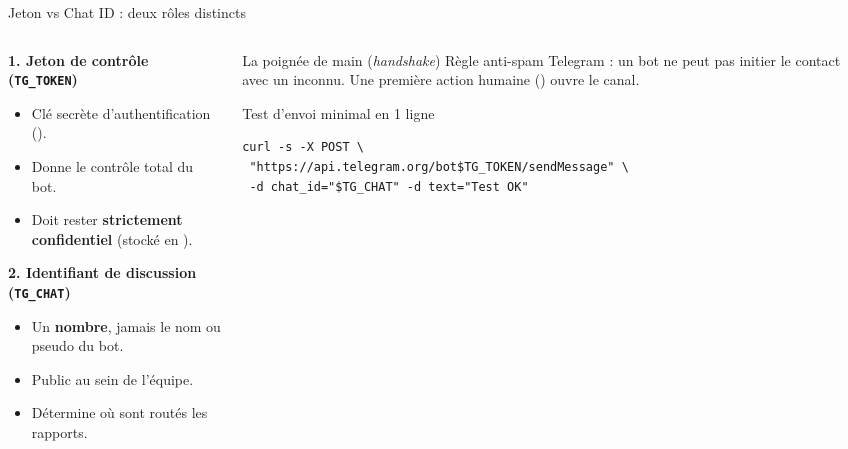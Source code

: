 \documentclass[aspectratio=169,10pt,t]{beamer}
\begin{document}
\begin{frame}[fragile]{Jeton vs Chat ID : deux r\^oles distincts}
\begin{columns}[T]\begin{column}{0.5\textwidth}
\textbf{1. Jeton de contr\^ole (\texttt{TG\_TOKEN})}
\begin{itemize}
\item Cl\'e secr\`ete d'authentification ().
\item Donne le contr\^ole total du bot.
\item Doit rester \textbf{strictement confidentiel} (stock\'e en ).
\end{itemize}
\vspace{0.2cm}
\textbf{2. Identifiant de discussion (\texttt{TG\_CHAT})}
\begin{itemize}
\item Un \textbf{nombre}, jamais le nom ou pseudo du bot.
\item Public au sein de l'\'equipe.
\item D\'etermine o\`u sont rout\'es les rapports.
\end{itemize}
\end{column}\begin{column}{0.48\textwidth}
\begin{alertblock}{La poign\'ee de main (\emph{handshake})}
R\`egle anti-spam Telegram : un bot ne peut pas initier le contact avec un inconnu. Une premi\`ere action humaine () ouvre le canal.
\end{alertblock}
\begin{exampleblock}{Test d'envoi minimal en 1 ligne}
\begin{lstlisting}[style=term]
curl -s -X POST \
 "https://api.telegram.org/bot$TG_TOKEN/sendMessage" \
 -d chat_id="$TG_CHAT" -d text="Test OK"
\end{lstlisting}
\end{exampleblock}
\end{column}\end{columns}
\end{frame}
\end{document}
